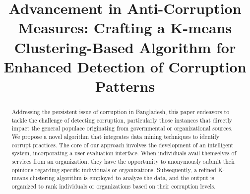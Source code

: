 \documentclass[conference]{IEEEtran}
\begin{document}
\title{Advancement in Anti-Corruption Measures: Crafting a K-means Clustering-Based Algorithm for Enhanced Detection of Corruption Patterns}

\author{
  \and
  \and
}

\maketitle

\vspace{-20pt}

\begin{abstract}
Addressing the persistent issue of corruption in Bangladesh, this paper endeavors to tackle the challenge of detecting corruption, particularly those instances that directly impact the general populace originating from governmental or organizational sources. We propose a novel algorithm that integrates data mining techniques to identify corrupt practices. The core of our approach involves the development of an intelligent system, incorporating a user evaluation interface. When individuals avail themselves of services from an organization, they have the opportunity to anonymously submit their opinions regarding specific individuals or organizations. Subsequently, a refined K-means clustering algorithm is employed to analyze the data, and the output is organized to rank individuals or organizations based on their corruption levels.
\end{abstract}
\end{document}
